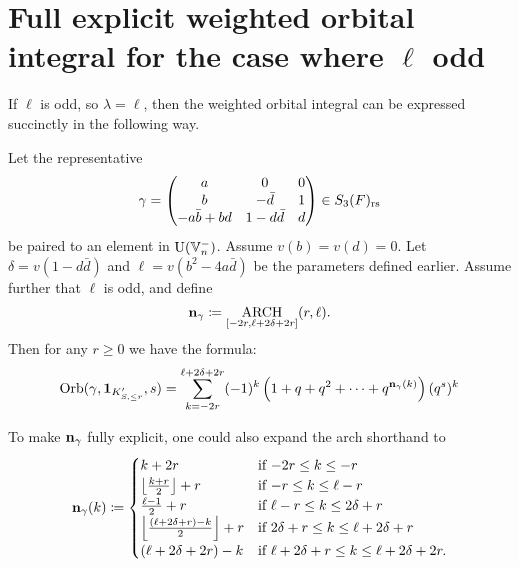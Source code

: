 \section{Full explicit weighted orbital integral for the case where $\ell$ odd}
If $\ell$ is odd, so $\lambda = \ell$, then
the weighted orbital integral can be expressed succinctly in the following way.
\begin{theorem}
  \label{thm:full_orbital_ell_odd}
  Let the representative
  \[ \gamma = \begin{pmatrix}
      a & 0 & 0 \\
      b & - \bar d & 1 \\
      -a \bar b + b d & 1 - d \bar d & d
    \end{pmatrix} \in S_3(F)_{\mathrm{rs}} \]
  be paired to an element in $\operatorname{U}(\mathbb V_n^-)$.
  Assume $v(b) = v(d) = 0$.
  Let $\delta = v(1 - d \bar d)$
  and $\ell = v(b^2 - 4 a \bar d)$ be the parameters defined earlier.
  Assume further that $\ell$ is odd, and define
  \[ \mathbf n_\gamma \coloneqq \operatorname*{ARCH}_{[-2r, \ell + 2\delta + 2r]}(r, \ell). \]
  Then for any $r \ge 0$ we have the formula:
  \[
    \operatorname{Orb}(\gamma, \mathbf{1}_{K'_{S, \le r}}, s)
    = \sum_{k = -2r}^{\ell + 2\delta + 2r}
    (-1)^k \left( 1 + q + q^2 + \dots + q^{\mathbf n_{\gamma}(k)}  \right) (q^s)^k
  \]
\end{theorem}
\begin{remark}
  To make $\mathbf n_\gamma$ fully explicit, one could also expand the arch shorthand to
  \[
    \mathbf n_\gamma(k)
    \coloneqq \begin{cases}
      k + 2r & \text{if } {-2r} \le k \le -r \\
      \left\lfloor \frac{k+r}{2} \right\rfloor + r & \text{if }{-r} \le k \le \ell-r \\
      \frac{\ell-1}{2} + r & \text{if } \ell - r \le k \le 2\delta + r \\
      \left\lfloor \frac{(\ell+2\delta+r)-k}{2} \right\rfloor + r & \text{if } 2\delta + r \le k \le \ell + 2\delta + r\\
      (\ell + 2\delta + 2r) - k & \text{if } \ell + 2\delta + r \le k \le \ell + 2\delta + 2r.
    \end{cases} \]
\end{remark}

